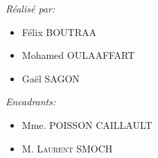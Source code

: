 \documentclass[12pt,a4paper]{report}
\begin{document}
\begin{titlepage}
\begin{sffamily}
\begin{center}
    \begin{minipage}{0.4\textwidth}
      \begin{flushleft} \large
\emph{Réalisé par:} \\
\begin{itemize} 
         \item  Félix \textsc{BOUTRAA}
	 \item  Mohamed \textsc{OULAAFFART}
	 \item    Gaël \textsc{SAGON}
     
\end{itemize} 
        \emph{}
      \end{flushleft}
    \end{minipage}
    \begin{minipage}{0.4\textwidth}
      \begin{flushright} \large
        \emph{Encadrants:}
\begin{itemize} 
     \item    Mme. \textsc{ POISSON CAILLAULT}
     \item   M. \textsc{Laurent SMOCH }
\end{itemize}
        \emph{}
      \end{flushright}
    \end{minipage}

    \vfill



  \end{center}
  \end{sffamily}
\end{titlepage}
	
	\newpage
	
	\tableofcontents
	
	\newpage
	
	\listoffigures
	
	\newpage
\end{document}
